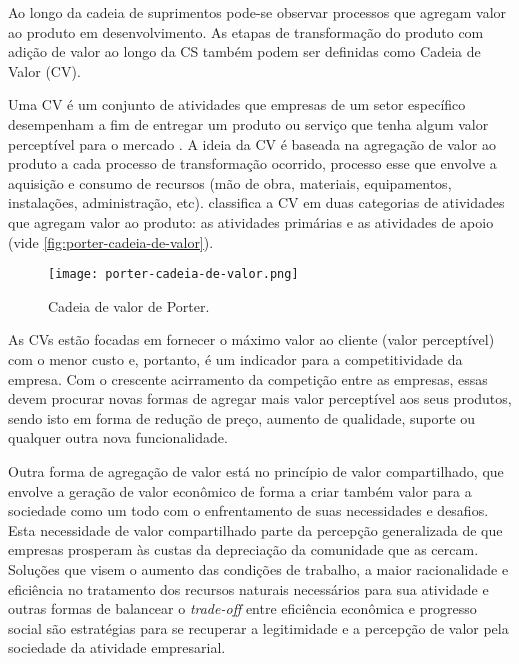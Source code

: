 	Ao longo da cadeia de suprimentos pode-se observar processos que agregam valor ao produto em desenvolvimento. As etapas de transformação do produto com adição de valor ao longo da CS também podem ser definidas como Cadeia de Valor (CV).
	
	Uma CV é um conjunto de atividades que empresas de um setor específico desempenham a fim de entregar um produto ou serviço que tenha algum valor perceptível para o mercado \cite{porter1985competitiveadvantage}. A ideia da CV é baseada na agregação de valor ao produto a cada processo de transformação ocorrido, processo esse que envolve a aquisição e consumo de recursos (mão de obra, materiais, equipamentos, instalações, administração, etc).  classifica a CV em duas categorias de atividades que agregam valor ao produto: as atividades primárias e as atividades de apoio (vide \autoref{fig:porter-cadeia-de-valor}).
	
	\begin{figure}[htb]
		\centering
		\label{fig:porter-cadeia-de-valor}
		\texttt{[image: porter-cadeia-de-valor.png]}
		\caption{Cadeia de valor de Porter.}
	\end{figure}
	
	As CVs estão focadas em fornecer o máximo valor ao cliente (valor perceptível) com o menor custo e, portanto, é um indicador para a competitividade da empresa. Com o crescente acirramento da competição entre as empresas, essas devem procurar novas formas de agregar mais valor perceptível aos seus produtos, sendo isto em forma de redução de preço, aumento de qualidade, suporte ou qualquer outra nova funcionalidade.
	
	Outra forma de agregação de valor está no princípio de valor compartilhado, que envolve a geração de valor econômico de forma a criar também valor para a sociedade como um todo \cite{porter2011valorcompartilhado} com o enfrentamento de suas necessidades e desafios. Esta necessidade de valor compartilhado parte da percepção generalizada de que empresas prosperam às custas da depreciação da comunidade que as cercam. Soluções que visem o aumento das condições de trabalho, a maior racionalidade e eficiência no tratamento dos recursos naturais necessários para sua atividade e outras formas de balancear o \textit{trade-off} entre eficiência econômica e progresso social são estratégias para se recuperar a legitimidade e a percepção de valor pela sociedade da atividade empresarial.
	
